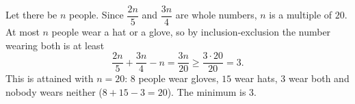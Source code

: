 Let there be $n$ people. Since $\dfrac{2n}{5}$ and $\dfrac{3n}{4}$ are whole numbers, $n$ is a multiple of $20$. At most $n$ people wear a hat or a glove, so by inclusion-exclusion the number wearing both is at least
\[\dfrac{2n}{5}+\dfrac{3n}{4}-n=\dfrac{3n}{20}\ge\dfrac{3\cdot20}{20}=3.\]
This is attained with $n=20$: $8$ people wear gloves, $15$ wear hats, $3$ wear both and nobody wears neither ($8+15-3=20$). The minimum is $\boxed{3}$.
